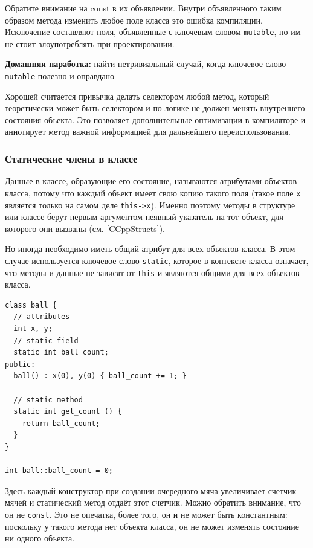 \documentclass[a4paper,12pt,oneside]{article}
\begin{document}
Обратите внимание на const в их объявлении. Внутри объявленного таким образом метода изменить любое поле класса это ошибка компиляции. Исключение составляют поля, объявленные с ключевым словом \lstinline!mutable!, но им не стоит злоупотреблять при проектировании.

\textbf{Домашняя наработка:} найти нетривиальный случай, когда ключевое слово \lstinline!mutable! полезно и оправдано

Хорошей считается привычка делать селектором любой метод, который теоретически может быть селектором и по логике не должен менять внутреннего состояния объекта. Это позволяет дополнительные оптимизации в компиляторе и аннотирует  метод важной информацией для дальнейшего переиспользования.

\subsubsection{Статические члены в классе}\label{StaticMembers}

Данные в классе, образующие его состояние, называются атрибутами объектов класса, потому что каждый объект имеет свою копию такого поля (такое поле \lstinline!x! является только на самом деле \lstinline!this->x!). Именно поэтому методы в структуре или классе берут первым аргументом неявный указатель на тот объект, для которого они вызваны (см. \ref{CCppStructs}).

Но иногда необходимо иметь общий атрибут для всех объектов класса. В этом случае используется ключевое слово \lstinline!static!, которое в контексте класса означает, что методы и данные не зависят от \lstinline!this! и являются общими для всех объектов класса.

\begin{lstlisting}
class ball {
  // attributes
  int x, y;
  // static field
  static int ball_count;
public: 
  ball() : x(0), y(0) { ball_count += 1; }

  // static method
  static int get_count () { 
    return ball_count; 
  }
}

int ball::ball_count = 0;
\end{lstlisting}

Здесь каждый конструктор при создании очередного мяча увеличивает счетчик мячей и статический метод отдаёт этот счетчик. Можно обратить внимание, что он не \lstinline!const!. Это не опечатка, более того, он и не может быть константным: поскольку у такого метода нет объекта класса, он не может изменять состояние ни одного объекта.
\end{document}
